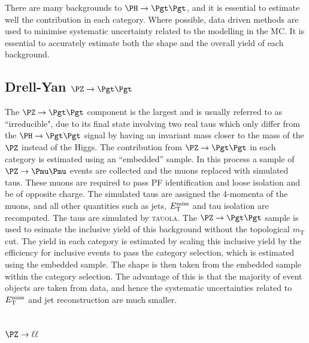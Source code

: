 There are many backgrounds to $\HToTauTau$, and it is essential to estimate well
the contribution in each category. Where possible, data driven methods
are used to minimise systematic uncertainty related to the modelling in the
\ac{MC}. It is essential to accurately estimate both the shape and the overall
yield of each background.

\subsection{Drell-Yan $\PZ \to\Pgt\Pgt$}
\label{sec:backgroundEstimation_Ztautau}

The $\PZ \to \Pgt\Pgt$ component is the largest and is usually referred to as ``irreducible", due to its final
state involving two real taus which only differ from the $\PH \to \Pgt\Pgt$ signal by
having an invariant mass closer to the mass of the $\PZ$ instead of the Higgs.
The contribution from $\ZToTauTau$ in each category is estimated using an
``embedded'' sample. In this process a sample of $\PZ\to\Pmu\Pmu$ events are
collected and the muons replaced with simulated taus. These muons are required
to pass \ac{PF} identification and loose isolation and be of opposite charge.
The simulated taus are assigned the 4-momenta of the muons, and all other
quantities such as jets, $E_{\mathrm{T}}^{\text{miss}}$ and tau isolation are recomputed. The taus
are simulated by \textsc{tauola}. The $\ZToTauTau$ sample is used to esimate 
the inclusive yield of this background without the topological $m_{\text{T}}$
cut. 
The yield in each category is estimated by scaling this inclusive yield by the efficiency for 
inclusive events to pass the category selection, which is estimated using the
embedded sample. The shape is then taken from the embedded sample within the
category selection. The advantage of this is that the majority of event objects
are taken from data, and hence the systematic uncertainties related to $E_{\mathrm{T}}^{\text{miss}}$
and jet reconstruction are much smaller. 


\subsection{$\PZ\to\ell\ell$}
\label{sec:backgroundEstimation_Zll}

